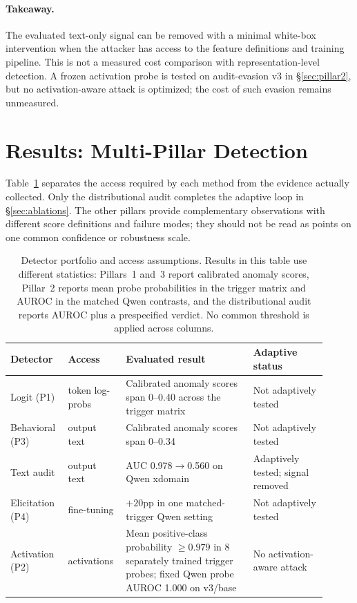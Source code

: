 \documentclass{article}
\begin{document}
\paragraph{Takeaway.}
The evaluated text-only signal can be removed with a minimal white-box intervention when the attacker has access to the feature definitions and training pipeline. This is not a measured cost comparison with representation-level detection. A frozen activation probe is tested on audit-evasion v3 in \S\ref{sec:pillar2}, but no activation-aware attack is optimized; the cost of such evasion remains unmeasured.

\section{Results: Multi-Pillar Detection}
\label{sec:detection}

Table~\ref{tab:detector-scorecard} separates the access required by each method from the evidence actually collected. Only the distributional audit completes the adaptive loop in \S\ref{sec:ablations}. The other pillars provide complementary observations with different score definitions and failure modes; they should not be read as points on one common confidence or robustness scale.

\begin{table}[t]
\begin{center}
\small
\begin{tabular}{@{}p{0.16\linewidth}p{0.15\linewidth}p{0.38\linewidth}p{0.22\linewidth}@{}}
\toprule
\textbf{Detector} & \textbf{Access} & \textbf{Evaluated result} & \textbf{Adaptive status} \\
\midrule
Logit (P1) & token log-probs & Calibrated anomaly scores span 0--0.40 across the trigger matrix & Not adaptively tested \\
Behavioral (P3) & output text & Calibrated anomaly scores span 0--0.34 & Not adaptively tested \\
Text audit & output text & AUC 0.978$\to$0.560 on Qwen xdomain & Adaptively tested; signal removed \\
Elicitation (P4) & fine-tuning & $+20$pp in one matched-trigger Qwen setting & Not adaptively tested \\
Activation (P2) & activations & Mean positive-class probability $\geq0.979$ in 8 separately trained trigger probes; fixed Qwen probe AUROC 1.000 on v3/base & No activation-aware attack \\
\bottomrule
\end{tabular}
\end{center}
\caption{Detector portfolio and access assumptions. Results in this table use different statistics: Pillars~1 and~3 report calibrated anomaly scores, Pillar~2 reports mean probe probabilities in the trigger matrix and AUROC in the matched Qwen contrasts, and the distributional audit reports AUROC plus a prespecified verdict. No common threshold is applied across columns.}
\label{tab:detector-scorecard}
\end{table}
\end{document}
